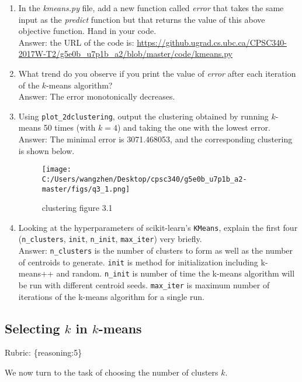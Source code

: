 \documentclass{article}
\def\blu#1{{\color{blu}#1}}
\def\gre#1{{\color{gre}#1}}
\def\enum#1{\begin{enumerate}#1\end{enumerate}}
\def\rubric#1{\gre{Rubric: \{#1\}}}{}
\begin{document}
 \blu{\enum{
 \item In the \emph{kmeans.py} file, add a new function called \emph{error} that takes the same input as the \emph{predict} function but that returns the value of this above objective function. Hand in your code.
 \textcolor{gre}{\\Answer: the URL of the code is: \url{https://github.ugrad.cs.ubc.ca/CPSC340-2017W-T2/g5e0b_u7p1b_a2/blob/master/code/kmeans.py}}
 \item What trend do you observe if you print the value of \emph{error} after each iteration of the $k$-means algorithm?
 \textcolor{gre}{\\Answer: The error monotonically decreases.}
 \item Using \texttt{plot\_2dclustering}, output the clustering obtained by running $k$-means 50 times (with $k=4$) and taking the one with the lowest error.
 \textcolor{gre}{\\Answer: The minimal error is 3071.468053, and the corresponding clustering is shown below.\\}
 \begin{figure}[h!]
\texttt{[image: C:/Users/wangzhen/Desktop/cpsc340/g5e0b\_u7p1b\_a2-master/figs/q3\_1.png]}
\caption{clustering figure 3.1}
\end{figure}
 \item Looking at the hyperparameters of scikit-learn's \texttt{KMeans}, explain the first four (\texttt{n\_clusters}, \texttt{init}, \texttt{n\_init}, \texttt{max\_iter}) very briefly.
 \textcolor{gre}{\\Answer: \texttt{n\_clusters} is the number of clusters to form as well as the number of centroids to generate. \texttt{init} is method for initialization including k-means++ and random. \texttt{n\_init} is number of time the k-means algorithm will be run with different centroid seeds. \texttt{max\_iter} is maximum number of iterations of the k-means algorithm for a single run.}
 }}


 \subsection{Selecting $k$ in $k$-means}
\rubric{reasoning:5}

 We now turn to the task of choosing the number of clusters $k$.
\end{document}
